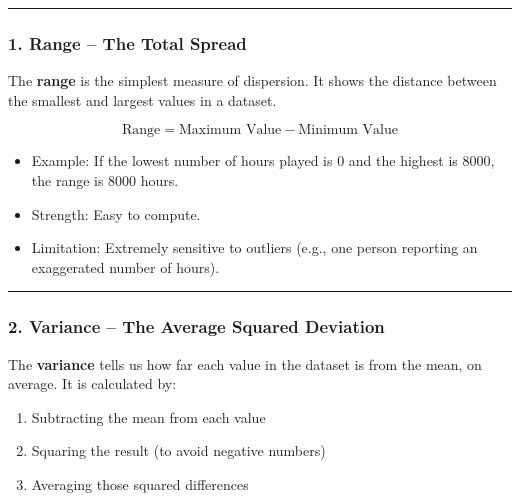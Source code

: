 \documentclass[
]{book}
\providecommand{\tightlist}{%
  \setlength{\itemsep}{0pt}\setlength{\parskip}{0pt}}
\begin{document}
\begin{center}\rule{0.5\linewidth}{0.5pt}\end{center}

\subsubsection*{\texorpdfstring{1. \textbf{Range} -- The Total Spread}{1. Range -- The Total Spread}}\label{range-the-total-spread}

The \textbf{range} is the simplest measure of dispersion. It shows the distance between the smallest and largest values in a dataset.

\[
\text{Range} = \text{Maximum Value} - \text{Minimum Value}
\]

\begin{itemize}
\tightlist
\item
  Example: If the lowest number of hours played is 0 and the highest is 8000, the range is 8000 hours.
\item
  Strength: Easy to compute.
\item
  Limitation: Extremely sensitive to outliers (e.g., one person reporting an exaggerated number of hours).
\end{itemize}

\begin{center}\rule{0.5\linewidth}{0.5pt}\end{center}

\subsubsection*{\texorpdfstring{2. \textbf{Variance} -- The Average Squared Deviation}{2. Variance -- The Average Squared Deviation}}\label{variance-the-average-squared-deviation}

The \textbf{variance} tells us how far each value in the dataset is from the mean, on average. It is calculated by:

\begin{enumerate}
\def\labelenumi{\arabic{enumi}.}
\tightlist
\item
  Subtracting the mean from each value
\item
  Squaring the result (to avoid negative numbers)
\item
  Averaging those squared differences
\end{enumerate}
\end{document}
